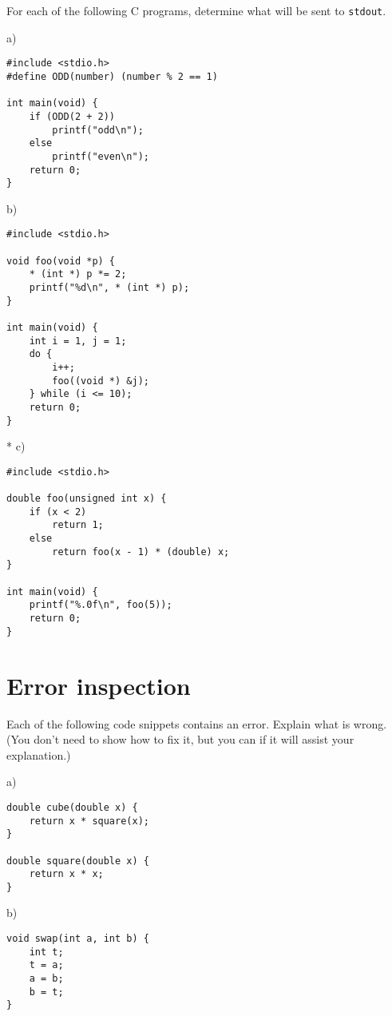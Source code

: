 \documentclass[a4paper,12pt]{article}
\begin{document}
For each of the following C programs, determine what will be sent to
\texttt{stdout}.

a) %

\begin{lstlisting}
#include <stdio.h>
#define ODD(number) (number % 2 == 1)

int main(void) {
	if (ODD(2 + 2))
		printf("odd\n");
	else
		printf("even\n");
	return 0;
}
\end{lstlisting}

b) %

\begin{lstlisting}
#include <stdio.h>

void foo(void *p) {
	* (int *) p *= 2;
	printf("%d\n", * (int *) p);
}

int main(void) {
	int i = 1, j = 1;
	do {
		i++;
		foo((void *) &j);
	} while (i <= 10);
	return 0;
}
\end{lstlisting}

* c) %

\begin{lstlisting}
#include <stdio.h>

double foo(unsigned int x) {
	if (x < 2)
		return 1;
	else
		return foo(x - 1) * (double) x;
}

int main(void) {
	printf("%.0f\n", foo(5));
	return 0;
}
\end{lstlisting}

\newpage

\section{Error inspection}

Each of the following code snippets contains an error. Explain what is
wrong. (You don't need to show how to fix it, but you can if it will
assist your explanation.)

a) %

\begin{lstlisting}
double cube(double x) {
	return x * square(x);
}

double square(double x) {
	return x * x;
}
\end{lstlisting}

b) %

\begin{lstlisting}
void swap(int a, int b) {
	int t;
	t = a;
	a = b;
	b = t;
}
\end{lstlisting}
\end{document}
